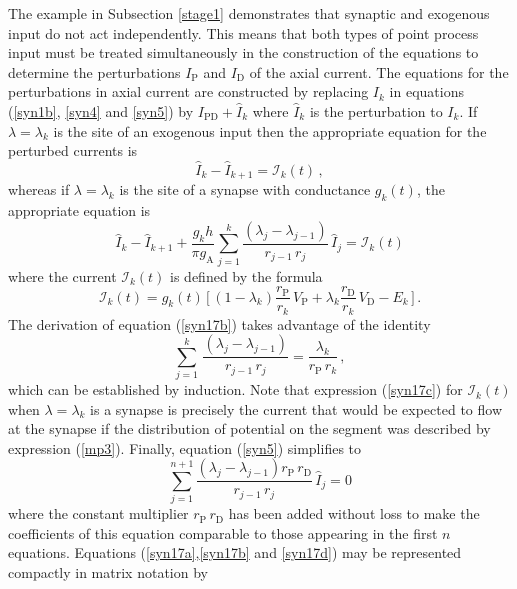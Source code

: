 The example in Subsection \ref{stage1} demonstrates that synaptic
and exogenous input do not act independently. This means that both
types of point process input must be treated simultaneously in the
construction of the equations to determine the perturbations
$I_\mathrm{P}$ and $I_\mathrm{D}$ of the axial current. The
equations for the perturbations in axial current are constructed
by replacing $I_k$ in equations (\ref{syn1b}, \ref{syn4} and
\ref{syn5}) by $I_\mathrm{PD}+\widehat{I}_k$ where $\widehat{I}_k$
is the perturbation to $I_k$. If $\lambda=\lambda_k$ is the site
of an exogenous input then the appropriate equation for the
perturbed currents is
\begin{equation}\label{syn17a}
\widehat{I}_k-\widehat{I}_{k+1}=\mathcal{I}_k(t)\,,
\end{equation}
whereas if $\lambda=\lambda_k$ is the site of a synapse with
conductance $g_k(t)$, the appropriate equation is
\begin{equation}\label{syn17b}
\widehat{I}_k-\widehat{I}_{k+1}+\frac{g_k h}{\pi g_\mathrm{A}}
\sum_{j=1}^k \frac{(\lambda_j-\lambda_{j-1})}{r_{j-1}\,r_j}\,
\widehat{I}_j = \mathcal{I}_k(t)
\end{equation}
where the current $\mathcal{I}_k(t)$ is defined by the formula
\begin{equation}\label{syn17c}
\mathcal{I}_k(t)=g_k(t)\,\Big[\,(1-\lambda_k)\frac{r_\mathrm{P}}{r_k}
\,V_\mathrm{P}+\lambda_k\frac{r_\mathrm{D}}{r_k}\, V_\mathrm{D}
-E_k\,\Big]\,.
\end{equation}
The derivation of equation (\ref{syn17b}) takes advantage of the
identity
\[
\sum_{j=1}^k \,\frac{(\lambda_j-\lambda_{j-1})}{r_{j-1}\,r_j}
=\frac{\lambda_k}{r_\mathrm{P}\,r_k}\,,
\]
which can be established by induction. Note that expression
(\ref{syn17c}) for $\mathcal{I}_k(t)$ when $\lambda=\lambda_k$ is
a synapse is precisely the current that would be expected to flow
at the synapse if the distribution of potential on the segment was
described by expression (\ref{mp3}). Finally, equation
(\ref{syn5}) simplifies to
\begin{equation}\label{syn17d}
\sum_{j=1}^{n+1}
\frac{(\lambda_j-\lambda_{j-1})r_\mathrm{P}\,r_\mathrm{D}}
{r_{j-1}\,r_j}\,\widehat{I}_j = 0
\end{equation}
where the constant multiplier $r_\mathrm{P}\,r_\mathrm{D}$ has
been added without loss to make the coefficients of this equation
comparable to those appearing in the first $n$ equations.
Equations (\ref{syn17a},\ref{syn17b} and \ref{syn17d}) may be
represented compactly in matrix notation by
